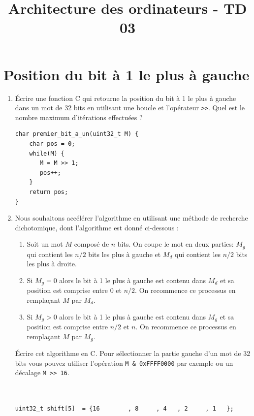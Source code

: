 \documentclass[a4paper,10pt]{exam}
\title{Architecture des ordinateurs - TD 03}
\author{}
\date{}
\begin{document}
\maketitle

\section{Position du bit à 1 le plus à gauche}
\begin{enumerate}
  \item Écrire une fonction C qui retourne la position du bit à 1
    le plus à gauche dans un mot de 32 bits en utilisant une boucle
    et l'opérateur \verb!>>!. Quel est le nombre maximum d'itérations
    effectuées ?
    \begin{solution}
\begin{verbatim}
char premier_bit_a_un(uint32_t M) {
    char pos = 0;
    while(M) {
       M = M >> 1;
       pos++;
    }
    return pos;
}
\end{verbatim}
    \end{solution}
  \item Nous souhaitons accélérer l'algorithme en utilisant une méthode
    de recherche dichotomique, dont l'algorithme est donné ci-dessous :
    \begin{enumerate}
      \item Soit un mot $M$ composé de $n$ bits. On coupe le mot en deux
        parties: $M_g$ qui contient les $n/2$ bits les plus à gauche et $M_d$
        qui contient les $n/2$ bits les plus à droite.
      \item Si $M_g = 0$ alors le bit à 1 le plus à gauche est contenu dans
        $M_d$ et sa position est comprise entre $0$ et $n/2$. On recommence
        ce processus en remplaçant $M$ par $M_d$.
      \item Si $M_g > 0$ alors le bit à 1 le plus à gauche est contenu dans
        $M_g$ et sa position est comprise entre $n/2$ et $n$. On recommence
        ce processus en remplaçant $M$ par $M_g$.
    \end{enumerate}

    Écrire cet algorithme en C. Pour sélectionner la partie gauche d'un mot de
    32 bits vous pouvez utiliser l'opération \texttt{M \& 0xFFFF0000} par exemple
    ou un décalage \verb!M >> 16!.

    \begin{solution}
\begin{verbatim}


uint32_t shift[5]  = {16        , 8     , 4   , 2     , 1   };


\end{verbatim}
\end{solution}
\end{enumerate}
\end{document}
